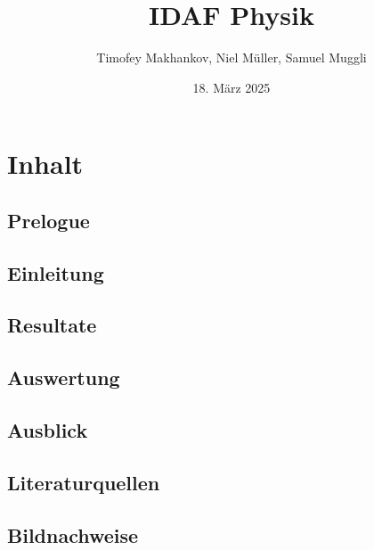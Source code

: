 \documentclass[12pt, a4paper]{report}
\title{IDAF Physik}
\author{Timofey Makhankov, Niel Müller, Samuel Muggli}
\date{18. März 2025}
\begin{document}
\maketitle
\begin{abstract}

\end{abstract}
\chapter{Inhalt}
\section{Prelogue}
\section{Einleitung}

\section{Resultate}
\section{Auswertung}
\section{Ausblick}
\section{Literaturquellen}
\section{Bildnachweise}
\end{document}
